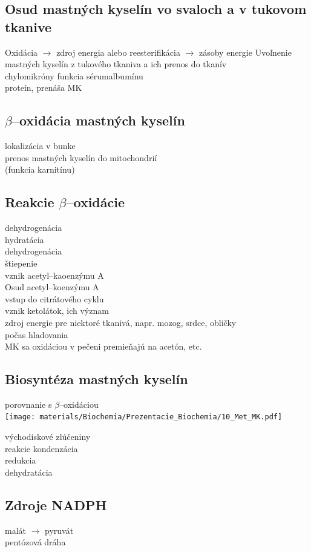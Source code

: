 \subsection{Osud mastných kyselín vo svaloch a v tukovom tkanive}
Oxidácia $\rightarrow$ zdroj energia alebo reesterifikácia $\rightarrow$ zásoby energie
Uvoľnenie mastných kyselín z tukového tkaniva a ich prenos do tkanív\\
\tab chylomikróny
funkcia sérumalbumínu\\
\tab proteín, prenáša MK
\subsection{$\beta$--oxidácia mastných kyselín}
lokalizácia v bunke\\
prenos mastných kyselín do mitochondrií\\
\tab (funkcia karnitínu)\\
\subsection{Reakcie $\beta$--oxidácie}
dehydrogenácia\\
hydratácia\\
dehydrogenácia\\
štiepenie\\
vznik acetyl--kaoenzýmu A\\
Osud acetyl--koenzýmu A\\
\tab vstup do citrátového cyklu\\
vznik ketolátok, ich význam\\
\tab zdroj energie pre niektoré tkanivá, napr. mozog, srdce, obličky\\
\tab počas hladovania\\
\tab MK sa oxidáciou v pečeni premieňajú na acetón, etc.\\
\subsection{Biosyntéza mastných kyselín}
porovnanie s $\beta$--oxidáciou\\

\texttt{[image: materials/Biochemia/Prezentacie\_Biochemia/10\_Met\_MK.pdf]}

východiskové zlúčeniny\\
reakcie kondenzácia\\
redukcia\\
dehydratácia\\
\subsection{Zdroje NADPH}
malát $\rightarrow$ pyruvát\\
pentózová dráha\\
